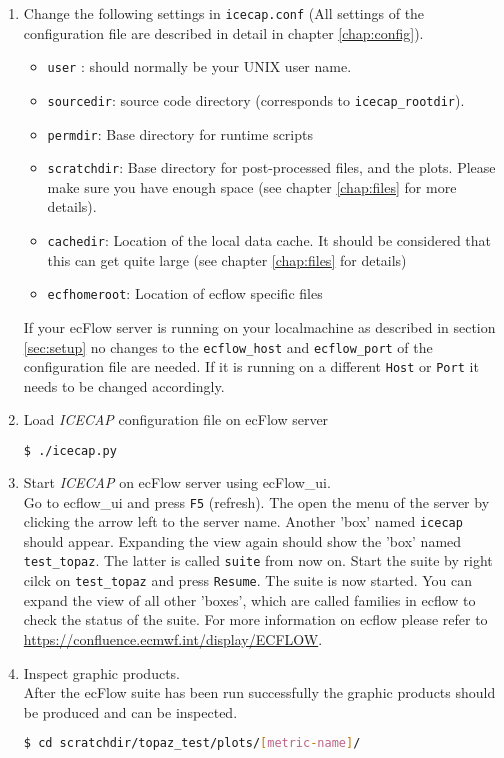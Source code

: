 \documentclass[DIV=10, parskip=full]{scrreprt}
\newcommand{\ice}{\textit{ICECAP}\xspace}
\begin{document}
\begin{enumerate}
	\item Change the following settings in \texttt{icecap.conf} (All settings of the configuration file are described in detail in chapter \ref{chap:config}). 
	\begin{itemize}
		\item \texttt{user} : should normally be your UNIX user name. 
		\item \texttt{sourcedir}: source code directory (corresponds to \texttt{icecap\_rootdir}).
		\item \texttt{permdir}:  Base directory for runtime scripts 
		\item \texttt{scratchdir}: Base directory for post-processed files, and the plots. Please make sure you have enough space (see chapter \ref{chap:files} for more details). 
		\item \texttt{cachedir}: Location of the local data cache. It should be considered that this can get quite large (see chapter \ref{chap:files} for details)
		\item \texttt{ecfhomeroot}: Location of ecflow specific files
	\end{itemize}
	If your ecFlow server is running on your localmachine as described in section \ref{sec:setup} no changes to the \texttt{ecflow\_host} and  \texttt{ecflow\_port} of the configuration file are needed. If it is running on a different \texttt{Host} or \texttt{Port} it needs to be changed accordingly.
	
	\item Load \ice configuration file on ecFlow server\\
	\begin{lstlisting}[language=bash]
		$ ./icecap.py
	\end{lstlisting}
	\item Start \ice on ecFlow server using ecFlow\_ui. \\
	Go to ecflow\_ui and press \texttt{F5} (refresh). The open the menu of the server by clicking the arrow left to the server name. Another 'box' named \texttt{icecap} should appear. Expanding the view again should show the 'box' named \texttt{test\_topaz}. The latter is called \texttt{suite} from now on. Start the suite by  right cilck on \texttt{test\_topaz} and press \texttt{Resume}. The suite is now started. You can expand the view of all other 'boxes', which are called families in ecflow to check the status of the suite. For more information on ecflow please refer to  \url{https://confluence.ecmwf.int/display/ECFLOW}.
	
	\item Inspect graphic products.  \\
	After the ecFlow suite has been run successfully the graphic products should be produced and can be inspected.
	\begin{lstlisting}[language=bash]
		$ cd scratchdir/topaz_test/plots/[metric-name]/
	\end{lstlisting}
	
\end{enumerate}
\end{document}
